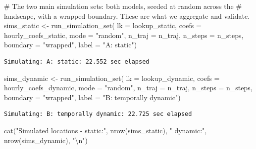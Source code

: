\documentclass[
  letterpaper,
  DIV=11,
  numbers=noendperiod]{scrartcl}
\newenvironment{Shaded}{\begin{snugshade}}{\end{snugshade}}
\newcommand{\AttributeTok}[1]{\textcolor[rgb]{0.40,0.45,0.13}{#1}}
\newcommand{\CommentTok}[1]{\textcolor[rgb]{0.37,0.37,0.37}{#1}}
\newcommand{\FunctionTok}[1]{\textcolor[rgb]{0.28,0.35,0.67}{#1}}
\newcommand{\NormalTok}[1]{\textcolor[rgb]{0.00,0.23,0.31}{#1}}
\newcommand{\OtherTok}[1]{\textcolor[rgb]{0.00,0.23,0.31}{#1}}
\newcommand{\SpecialCharTok}[1]{\textcolor[rgb]{0.37,0.37,0.37}{#1}}
\newcommand{\StringTok}[1]{\textcolor[rgb]{0.13,0.47,0.30}{#1}}
\begin{document}
\begin{Shaded}
\begin{Highlighting}[]
\CommentTok{\# The two main simulation sets: both models, seeded at random across the}
\CommentTok{\# landscape, with a wrapped boundary. These are what we aggregate and validate.}
\NormalTok{sims\_static }\OtherTok{\textless{}{-}} \FunctionTok{run\_simulation\_set}\NormalTok{(}
  \AttributeTok{lk =}\NormalTok{ lookup\_static, }\AttributeTok{coefs =}\NormalTok{ hourly\_coefs\_static, }\AttributeTok{mode =} \StringTok{"random"}\NormalTok{,}
  \AttributeTok{n\_traj =}\NormalTok{ n\_traj, }\AttributeTok{n\_steps =}\NormalTok{ n\_steps, }\AttributeTok{boundary =} \StringTok{"wrapped"}\NormalTok{,}
  \AttributeTok{label =} \StringTok{"A: static"}\NormalTok{)}
\end{Highlighting}
\end{Shaded}

\begin{verbatim}
Simulating: A: static: 22.552 sec elapsed
\end{verbatim}

\begin{Shaded}
\begin{Highlighting}[]
\NormalTok{sims\_dynamic }\OtherTok{\textless{}{-}} \FunctionTok{run\_simulation\_set}\NormalTok{(}
  \AttributeTok{lk =}\NormalTok{ lookup\_dynamic, }\AttributeTok{coefs =}\NormalTok{ hourly\_coefs\_dynamic, }\AttributeTok{mode =} \StringTok{"random"}\NormalTok{,}
  \AttributeTok{n\_traj =}\NormalTok{ n\_traj, }\AttributeTok{n\_steps =}\NormalTok{ n\_steps, }\AttributeTok{boundary =} \StringTok{"wrapped"}\NormalTok{,}
  \AttributeTok{label =} \StringTok{"B: temporally dynamic"}\NormalTok{)}
\end{Highlighting}
\end{Shaded}

\begin{verbatim}
Simulating: B: temporally dynamic: 22.725 sec elapsed
\end{verbatim}

\begin{Shaded}
\begin{Highlighting}[]
\FunctionTok{cat}\NormalTok{(}\StringTok{"Simulated locations {-} static:"}\NormalTok{, }\FunctionTok{nrow}\NormalTok{(sims\_static),}
    \StringTok{" dynamic:"}\NormalTok{, }\FunctionTok{nrow}\NormalTok{(sims\_dynamic), }\StringTok{"}\SpecialCharTok{\textbackslash{}n}\StringTok{"}\NormalTok{)}
\end{Highlighting}
\end{Shaded}
\end{document}
